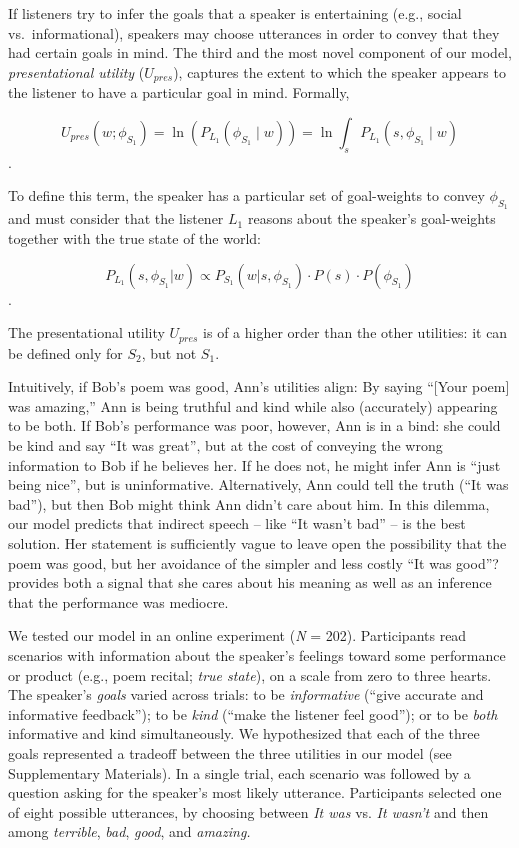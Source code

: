 \documentclass[12pt]{article}
\begin{document}
If listeners try to infer the goals that a speaker is entertaining
(e.g., social vs.~informational), speakers may choose utterances in
order to convey that they had certain goals in mind. The third and the
most novel component of our model, \emph{presentational utility}
(\(U_{pres}\)), captures the extent to which the speaker appears to the
listener to have a particular goal in mind. Formally,

\[U_{pres}(w; \phi_{S_{1}}) = \ln(P_{L_1}(\phi_{S_1} \mid w)) = \ln \int_s P_{L_1}(s, \phi_{S_1} \mid w)\].

\noindent To define this term, the speaker has a particular set of goal-weights to convey $\phi_{S_{1}}$ and must consider that the listener \(L_1\) reasons about the speaker's goal-weights together with the true state of the world:

\[P_{L_1}(s, \phi_{S_{1}}| w) \propto P_{S_1}(w | s, \phi_{S_{1}}) \cdot P(s) \cdot P(\phi_{S_{1}})\].

\noindent The presentational utility $U_{pres}$ is of a higher order than the other utilities: it can be defined only for \(S_2\), but not \(S_1\).

Intuitively, if Bob's poem was good, Ann's utilities align:
By saying \enquote{{[}Your poem{]} was amazing,}
Ann is being truthful and kind while also (accurately) appearing to be both.
If Bob's performance was poor, however, Ann is in a bind: she could be kind and say \enquote{It was great}, but at the cost of conveying the wrong information to Bob if he believes her. If he does not, he might infer Ann is \enquote{just being nice}, but is uninformative.
Alternatively, Ann could tell the truth (\enquote{It was bad}), but then
Bob might think Ann didn't care about him. In this dilemma, our model predicts that indirect speech -- like \enquote{It wasn't bad} -- is the best solution. Her statement is sufficiently vague to leave open the possibility that the poem was good, but her avoidance of the simpler and less costly \enquote{It was good}? provides both a signal that she cares about his meaning as well as an inference that the performance was mediocre.


We tested our model in an online experiment (\emph{N} = 202).
Participants read scenarios with information about the speaker's
feelings toward some performance or product (e.g., poem recital;
\emph{true state}), on a scale from zero to three hearts. The speaker's \emph{goals} varied across trials: to be \emph{informative}
(\enquote{give accurate and informative feedback}); to be \emph{kind}
(\enquote{make the listener feel good}); or to be \emph{both}
informative and kind simultaneously. We hypothesized that each of the
three goals represented a tradeoff between the three utilities in our
model (see Supplementary Materials). In a single trial, each scenario
was followed by a question asking for the speaker's most likely utterance.
Participants selected one of eight possible utterances, by choosing
between \emph{It was} vs. \emph{It wasn't} and then among
\emph{terrible}, \emph{bad}, \emph{good}, and \emph{amazing.}
\end{document}
